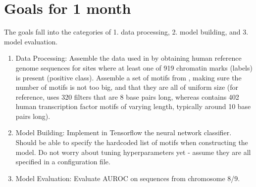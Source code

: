 \documentclass[11pt]{amsart}
\begin{document}
\section{Goals for 1 month}
The goals fall into the categories of 1. data processing, 2. model building, and 3. model evaluation.
\begin{enumerate}
\item Data Processing: Assemble the data used in \cite{zhou2015predicting} by obtaining human reference genome sequences for sites where at least one of 919 chromatin marks (labels) is present (positive class).  Assemble a set of motifs from \cite{doi:10.1093/nar/gkx1106}, making sure the number of motifs is not too big, and that they are all of uniform size (for reference, \cite{zhou2015predicting} uses 320 filters that are 8 base pairs long, whereas \cite{doi:10.1093/nar/gkx1106} contains 402 human transcription factor motifs of varying length, typically around 10 base pairs long).
\item Model Building: Implement in Tensorflow the neural network classifier.  Should be able to specify the hardcoded list of motifs when constructing the model.  Do not worry about tuning hyperparameters yet - assume they are all specified in a configuration file.
\item Model Evaluation: Evaluate AUROC on sequences from chromosome 8/9.
\end{enumerate}



\end{document}
